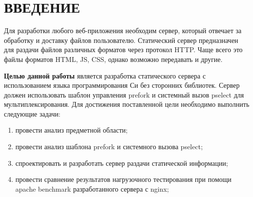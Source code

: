 \newpage
\chapter*{ВВЕДЕНИЕ}

Для разработки любого веб-приложения необходим сервер, который отвечает за обработку и доставку файлов пользователю. Статический сервер предназначен для раздачи файлов различных форматов через протокол HTTP. Чаще всего это файлы форматов HTML, JS, CSS, однако возможно передавать и другие.

\textbf{Целью данной работы} является разработка статического сервера с использованием языка программирования Си без сторонних библиотек. Сервер должен использовать шаблон управления prefork и системный вызов pselect для мультиплексирования.
Для достижения поставленной цели необходимо выполнить следующие задачи:
\begin{enumerate}[label=\arabic*)]
	\item провести анализ предметной области;
	\item провести анализ шаблона prefork и системного вызова pselect;
	\item спроектировать и разработать сервер раздачи статической информации;
	\item провести сравнение результатов нагрузочного тестирования при помощи apache benchmark разработанного сервера с nginx;
\end{enumerate}


